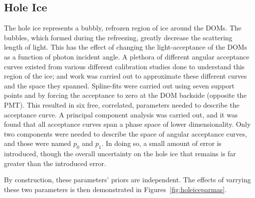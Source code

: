 \documentclass[main.tex]{subfiles}
\begin{document}
\subsection{Hole Ice}

The hole ice represents a bubbly, refrozen region of ice around the DOMs. 
The bubbles, which formed during the refreezing, greatly decrease the scattering length of light. 
This has the effect of changing the light-acceptance of the DOMs as a function of photon incident angle. 
A plethora of different angular acceptance curves existed from various different calibration studies done to understand this region of the ice; and work was carried out to approximate these different curves and the space they spanned. 
Spline-fits were carried out using seven support points and by forcing the acceptance to zero at the DOM backside (opposite the PMT). 
This resulted in six free, correlated, parameters needed to describe the acceptance curve. 
A principal component analysis was carried out, and it was found that all acceptance curves span a phase space of lower dimensionality. 
Only two components were needed to describe the space of angular acceptance curves, and those were named $p_{0}$ and $p_{1}$.
In doing so, a small amount of error is introduced, though the overall uncertainty on the hole ice that remains is far greater than the introduced error. 

By construction, these parameters' priors are independent.
The effects of varrying these two parameters is then demonstrated in Figures~\ref{fig:holeiceparmas}.
\end{document}
